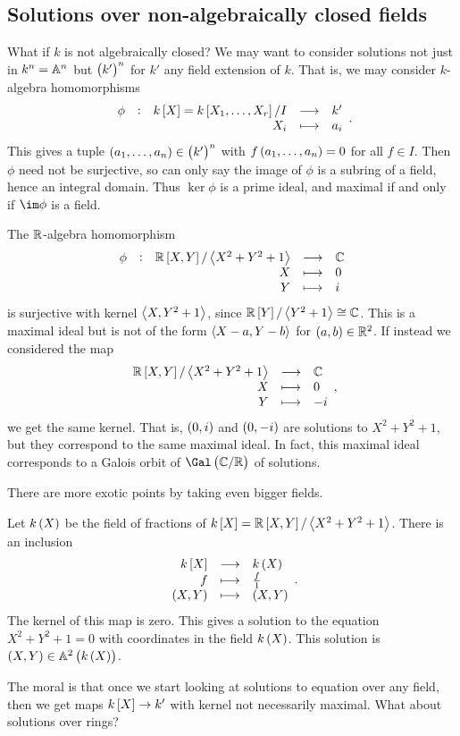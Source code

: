 \subsection{Solutions over non-algebraically closed fields}

What if $ k $ is not algebraically closed? We may want to consider solutions not just in $ k^n = \AA^n $ but $ \br{k'}^n $ for $ k' $ any field extension of $ k $. That is, we may consider $ k $-algebra homomorphisms
$$ \function[\phi]{k\sbr{X} = k\sbr{X_1, \dots, X_r} / I}{k'}{X_i}{a_i}. $$
This gives a tuple $ \br{a_1, \dots, a_n} \in \br{k'}^n $ with $ f\br{a_1, \dots, a_n} = 0 $ for all $ f \in I $. Then $ \phi $ need not be surjective, so can only say the image of $ \phi $ is a subring of a field, hence an integral domain. Thus $ \ker \phi $ is a prime ideal, and maximal if and only if $ \im \phi $ is a field.

\begin{example*}
The $ \RR $-algebra homomorphism
$$ \functions[\phi]{\RR\sbr{X, Y} / \abr{X^2 + Y^2 + 1}}{\CC}{X}{0}{Y}{i} $$
is surjective with kernel $ \abr{X, Y^2 + 1} $, since $ \RR\sbr{Y} / \abr{Y^2 + 1} \cong \CC $. This is a maximal ideal but is not of the form $ \abr{X - a, Y - b} $ for $ \br{a, b} \in \RR^2 $. If instead we considered the map
$$ \functions{\RR\sbr{X, Y} / \abr{X^2 + Y^2 + 1}}{\CC}{X}{0}{Y}{-i}, $$
we get the same kernel. That is, $ \br{0, i} $ and $ \br{0, -i} $ are solutions to $ X^2 + Y^2 + 1 $, but they correspond to the same maximal ideal. In fact, this maximal ideal corresponds to a Galois orbit of $ \Gal\br{\CC / \RR} $ of solutions.
\end{example*}


There are more exotic points by taking even bigger fields.

\begin{example*}
Let $ k\br{X} $ be the field of fractions of $ k\sbr{X} = \RR\sbr{X, Y} / \abr{X^2 + Y^2 + 1} $. There is an inclusion
$$ \functions{k\sbr{X}}{k\br{X}}{f}{\tfrac{f}{1}}{\br{X, Y}}{\br{X, Y}}. $$
The kernel of this map is zero. This gives a solution to the equation $ X^2 + Y^2 + 1 = 0 $ with coordinates in the field $ k\br{X} $. This solution is $ \br{X, Y} \in \AA^2\br{k\br{X}} $.
\end{example*}

The moral is that once we start looking at solutions to equation over any field, then we get maps $ k\sbr{X} \to k' $ with kernel not necessarily maximal. What about solutions over rings?

